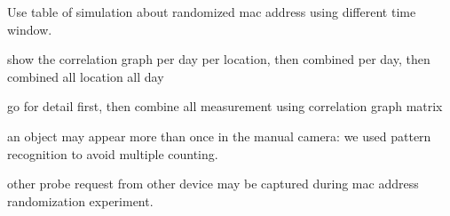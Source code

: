 Use table of simulation about randomized mac address using different time window.

show the correlation graph per day per location, then combined per day, then combined all location all day

go for detail first, then combine all measurement using correlation graph matrix

an object may appear more than once in the manual camera: we used pattern recognition to avoid multiple counting.

other probe request from other device may be captured during mac address randomization experiment.

